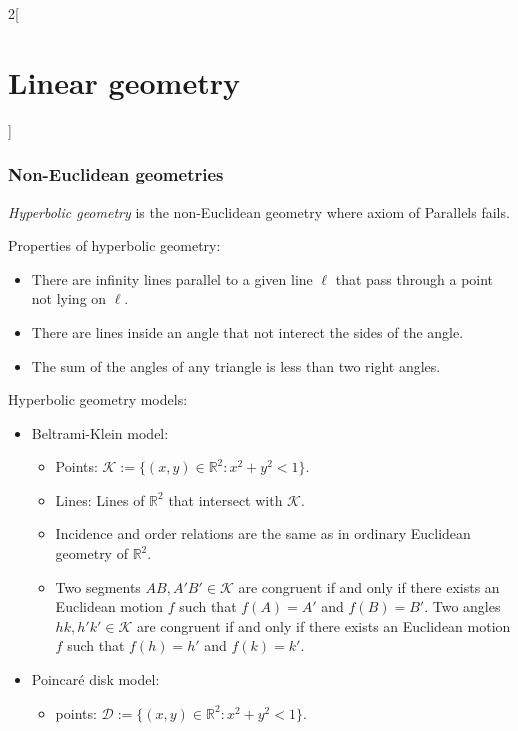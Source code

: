 \documentclass[class=article,10pt,crop=false]{standalone}
\begin{document}
\begin{multicols}{2}[\section{Linear geometry}]
\subsubsection{Non-Euclidean geometries}
\begin{definition}
\textit{Hyperbolic geometry} is the non-Euclidean geometry where axiom of Parallels fails.
\end{definition}
\begin{prop}
Properties of hyperbolic geometry:
\begin{itemize}
    \item There are infinity lines parallel to a given line $\ell$ that pass through a point not lying on $\ell$.
    \item There are lines inside an angle that not interect the sides of the angle.
    \item The sum of the angles of any triangle is less than two right angles.
\end{itemize}
\end{prop}
\begin{definition}
Hyperbolic geometry models:
\begin{itemize}
    \item Beltrami-Klein model:
    \begin{itemize}
        \item Points: $\mathcal{K}:=\{(x,y)\in\mathbb{R}^2:x^2+y^2<1\}$.
        \item Lines: Lines of $\mathbb{R}^2$ that intersect with $\mathcal{K}$.
        \item Incidence and order relations are the same as in ordinary Euclidean geometry of $\mathbb{R}^2$.
        \item Two segments $AB,A'B'\in\mathcal{K}$ are congruent if and only if there exists an Euclidean motion $f$ such that $f(A)=A'$ and $f(B)=B'$. Two angles $hk,h'k'\in\mathcal{K}$ are congruent if and only if there exists an Euclidean motion $f$ such that $f(h)=h'$ and $f(k)=k'$.
    \end{itemize}
    \begin{figure}[ht] 
        \centering 
    \end{figure} 
    \item Poincaré disk model:
    \begin{itemize}
        \item points: $\mathcal{D}:=\{(x,y)\in\mathbb{R}^2:x^2+y^2<1\}$.

\end{itemize}
\end{itemize}
\end{definition}
\end{multicols}
\end{document}
